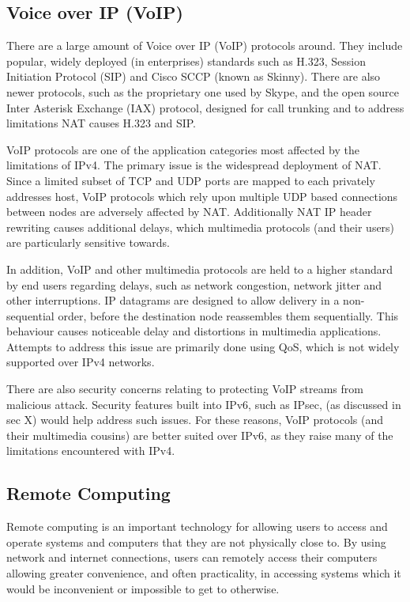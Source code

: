 \documentclass[a4paper,12pt]{article}
\begin{document}
\subsection{Voice over IP (VoIP)}

There are a large amount of Voice over IP (VoIP) protocols around. They
include popular, widely deployed (in enterprises) standards such as 
H.323, Session Initiation Protocol (SIP) and Cisco SCCP (known as
Skinny). There are also newer protocols, such as the proprietary one used
by Skype, and the open source Inter Asterisk Exchange (IAX) protocol,
designed for call trunking and to address limitations NAT causes H.323
and SIP.


VoIP protocols are one of the application categories most affected by
the limitations of IPv4. The primary issue is the widespread deployment
of NAT. Since a limited subset of TCP and UDP ports are mapped to each
privately addresses host, VoIP protocols which rely upon multiple UDP
based connections between nodes are adversely affected by NAT.
Additionally NAT IP header rewriting causes additional delays, which 
multimedia protocols (and their users) are particularly sensitive 
towards.


In addition, VoIP and other multimedia protocols are held to a higher
standard by end users regarding delays, such as network congestion, 
network jitter  and other interruptions. IP datagrams are designed to 
allow delivery in a non-sequential order, before the destination node 
reassembles them sequentially. This behaviour causes noticeable delay 
and distortions in multimedia applications. Attempts to address this 
issue are primarily done using QoS, which is not widely supported over 
IPv4 networks.


There are also security concerns relating to protecting VoIP streams
from malicious attack. Security features built into IPv6, such as IPsec,
(as discussed in sec X) would help address such issues. For these 
reasons, VoIP protocols (and their multimedia cousins) are better suited 
over IPv6, as they raise many of the limitations encountered with IPv4. 

\subsection{Remote Computing}

Remote computing is an important technology for allowing users to access
and operate systems and computers that they are not physically close 
to. By using network and internet connections, users can remotely access 
their computers allowing greater convenience, and often practicality, 
in accessing systems which it would be inconvenient or impossible to get 
to otherwise. 
\end{document}
